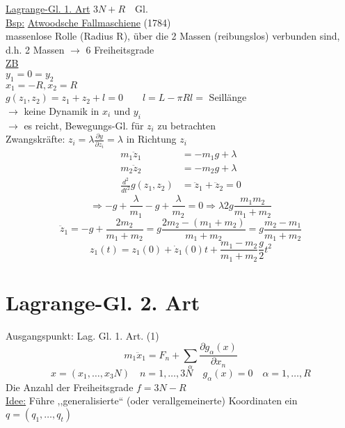 \documentclass[titlepage,12pt,a4paper,ngerman]{report}
\newcommand{\tx}[1]{\textrm{#1}}
\begin{document}
\underline{Lagrange-Gl. 1. Art}
$ 3N+R \quad \tx{Gl.} $\\
\underline{Bsp:} \underline{Atwoodsche Fallmaschiene} (1784)\\
massenlose Rolle (Radius R), über die 2 Massen (reibungslos) verbunden sind, d.h. 2 Massen $ \rightarrow $ 6 Freiheitsgrade\\
\underline{ZB} \\
$ y_1 = 0 = y_2 $\\
$ x_1 = - R , x_2 = R $\\
$  g(z_1,z_2) = z_1 + z_2 + l = 0 \qquad l = L- \pi R  l = $ Seillänge\\
$ \rightarrow $ keine Dynamik in $ x_i $ und $ y_i $\\
$ \rightarrow $ es reicht, Bewegungs-Gl. für $ z_i $ zu betrachten\\
Zwangskräfte: $  z_i = \lambda \frac{\partial y}{\partial z_i}  = \lambda $ in Richtung $ z_i $\\
\begin{align*}
m_1 \ddot{z}_1 &= - m_1 g + \lambda \\
m_2 \ddot{z}_2 &= - m_2 g + \lambda \\
\frac{d^2}{dt^2} g(z_1,z_2) &= \ddot{z}_1 + \ddot{z}_2 = 0
\end{align*}
$$ \Rightarrow -g +\frac{\lambda}{m_1} - g + \frac{\lambda}{m_2} = 0 \Rightarrow \lambda 2 g \frac{m_1 m_2 }{m_1 + m_2}$$
$$ \ddot{z}_1 = -g + \frac{2 m_2}{m_1 + m_2} = g \frac{2 m_2 - (m_1 + m_2)}{m_1 + m_2} = g \frac{m_2 - m_1}{m_1 + m_2}$$
$$ z_1(t) = z_1(0) + \dot{z}_1(0) t + \frac{m_1 - m_2}{m_1 + m_2} \frac{g}{2} t^2 $$

\section{Lagrange-Gl. 2. Art}
Ausgangspunkt: Lag. Gl. 1. Art. (1)
\begin{equation*}
m_1 \ddot{x}_1 = F_n + \sum_\alpha \frac{\partial g_\alpha (x)}{\partial x_n} \tag{1}
\end{equation*}
$$ x = (x_1,\dots,x_3N) \quad n = 1,\dots,3N \quad g_\alpha (x) = 0 \quad \alpha = 1,\dots, R $$
Die Anzahl der Freiheitsgrade $ f = 3N - R $\\
\underline{Idee:} Führe ,,generalisierte`` (oder verallgemeinerte) Koordinaten ein $ q = (q_1, \dots, q_t) $
\end{document}
